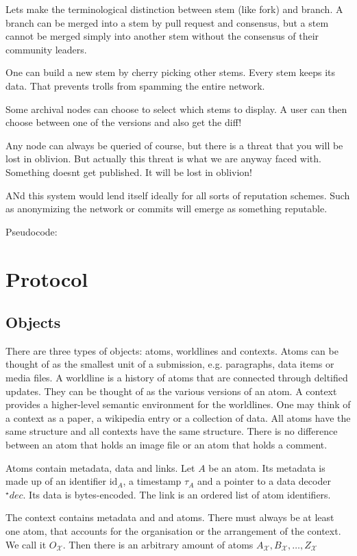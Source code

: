 \documentclass[14pt]{article}
\begin{document}
Lets make the terminological distinction between stem (like fork) and branch. A branch can be merged into a stem by pull request and consensus, but a stem cannot be merged simply into another stem without the consensus of their community leaders. 

One can build a new stem by cherry picking other stems. Every stem keeps its data. That prevents trolls from spamming the entire network.

Some archival nodes can choose to select which stems to display. 
A user can then choose between one of the versions and also get the diff! 

Any node can always be queried of course, but there is a threat that you will be lost in oblivion. But actually this threat is what we are anyway faced with. Something doesnt get published. It will be lost in oblivion!

ANd this system would lend itself ideally for all sorts of reputation schemes. Such as anonymizing the network or commits will emerge as something reputable. 

Pseudocode:


\section{Protocol}

\subsection{Objects}
There are three types of objects: atoms, worldlines and contexts. 
Atoms can be thought of as the smallest unit of a submission, e.g. paragraphs, data items or media files. A worldline is a history of atoms that are connected through deltified updates. They can be thought of as the various versions of an atom. A context provides a higher-level semantic environment for the worldlines. One may think of a context as a paper, a wikipedia entry or a collection of data. All atoms have the same structure and all contexts have the same structure. There is no difference between an atom that holds an image file or an atom that holds a comment.  

Atoms contain metadata, data and links. Let $A$ be an atom. Its metadata is made up of an identifier $\textrm{id}_A$, a timestamp $\tau_A$ and a pointer to a data decoder ${}^{\star}\!dec$. Its data is bytes-encoded. The link is an ordered list of atom identifiers.

The context contains metadata and and atoms. There must always be at least one atom, that accounts for the organisation or the arrangement of the context. We call it $O_{\mathcal X}$. Then there is an arbitrary amount of atoms $A_{\mathcal X}, B_{\mathcal X}, \dots , Z_{\mathcal X}$
\end{document}
